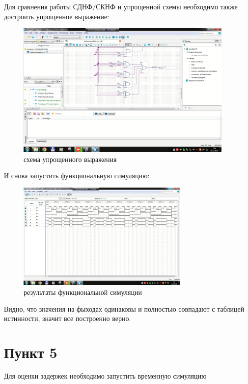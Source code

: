 \documentclass[a4paper]{article}
\begin{document}
  Для сравнения работы СДНФ/СКНФ и упрощенной схемы необходимо также достроить упрощенное выражение:
  \begin{figure}[H]
    \centering
    \includegraphics[width=0.95\textwidth]{02_40}
    \caption{схема упрощенного выражения}
  \end{figure}

  И снова запустить функциональную симуляцию:
  \begin{figure}[H]
    \centering
    \includegraphics[width=0.75\textwidth]{02_41}
    \caption{результаты функциональной симуляции}
  \end{figure}

  Видно, что значения на фыходах одинаковы и полностью совпадают с таблицей истинности, значит
  все построенно верно.

  \section*{Пункт 5}

  Для оценки задержек необходимо запустить временную симуляцию
\end{document}
